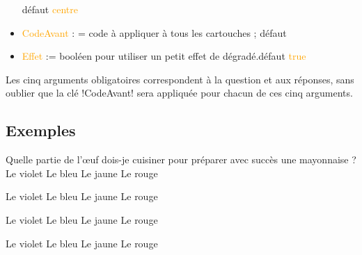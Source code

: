 \documentclass[french,a4paper,11pt]{article}
\newcommand\Cle[1]{{\small\sffamily\textlangle \textcolor{orange}{#1}\textrangle}}
\newcommand\cmaj[1]{\tcbox[vignetteMaJ]{#1}\xspace}
\begin{document}
\begin{tipblock}
\begin{itemize}
	\hfill{}défaut \Cle{centre}
	\item \cmaj{0.1.1} \Cle{CodeAvant} : = code à appliquer à tous les cartouches ; \hfill{}défaut \Cle{}
	\item \Cle{Effet} := booléen pour utiliser un petit effet de dégradé.\hfill{}défaut \Cle{true}
\end{itemize}
\vspace*{-\baselineskip}\leavevmode
\end{tipblock}

\begin{tipblock}
Les cinq arguments obligatoires correspondent à la question et aux réponses, sans oublier que la clé \motcletex!CodeAvant! sera appliquée pour chacun de ces cinq arguments.
\end{tipblock}

\subsection{Exemples}

\begin{DemoCode}[]
\QuizzMillions
	{Quelle partie de l'\oe{}uf dois-je cuisiner pour préparer avec succès une mayonnaise ?}
	{Le violet} {Le bleu}
	{Le jaune} {Le rouge}
\end{DemoCode}

\begin{DemoCode}[]
	{Le violet} {Le bleu}
	{Le jaune} {Le rouge}
\end{DemoCode}

\begin{DemoCode}[]
	{Le violet} {Le bleu}
	{Le jaune} {Le rouge}
\end{DemoCode}

\begin{DemoCode}[]
	{Le violet} {Le bleu}
	{Le jaune} {Le rouge}
\end{DemoCode}
\end{document}
